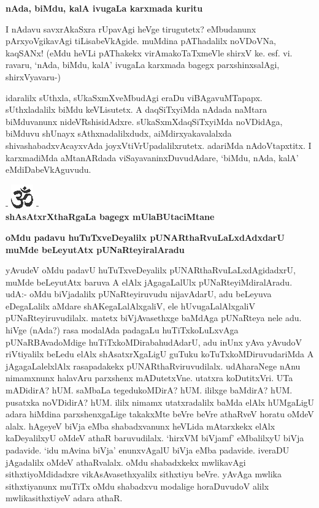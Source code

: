 {\bigskip
\noindent
{\large\bf nAda, biMdu, kalA ivugaLa karxmada kuritu}}\label{page177}
\medskip

\noindent
I nAdavu savxrAkaSxra rUpavAgi heVge tirugutetx? eMbudanunx pArxyoVgikavAgi tiLisabeVkAgide. muMdina pAThadalilx noVDoVNa, kaqSANx! (eMdu heVLi pAThakekx virAmakoTaTxmeVle shirxV ke. esf. vi. ravaru, `nAda, biMdu, kalA' ivugaLa karxmada bagegx parxshinxsalAgi, shirxVyavaru-)


idaralilx sUthxla, sUkaSxmXveMbudAgi eraDu viBAgavuMTapapx. sUthxladalilx biMdu keVLisutetx. A daqSiTxyiMda nAdada naMtara biMduvanunx nideVRshisidAdxre. sUkaSxmXdaqSiTxyiMda noVDidAga, biMduvu shUnayx sAthxnadalilxdudx, aiMdirxyakavalalxda shivashabadxvAcayxvAda joyxVtiVrUpadalilxrutetx. adariMda nAdoVtapxtitx. I karxmadiMda aMtanARdada viSayavaninxDuvudAdare, `biMdu, nAda, kalA' eMdiDabeVkAguvudu.


\bigskip

\begin{center}
- \includegraphics{om.eps} -\\[8pt]
{\bf\Large{shAsAtxrXthaRgaLa bagegx mUlaBUtaciMtane}}
\end{center}

{\medskip
\noindent
{\large\bf oMdu padavu huTuTxveDeyalilx pUNARthaRvuLaLxdAdxdarU muMde beLeyutAtx pUNaRteyiralAradu}}\label{page177a}
\medskip

\noindent
yAvudeV oMdu padavU huTuTxveDeyalilx pUNARthaRvuLaLxdAgidadxrU, muMde beLeyutAtx baruva A elAlx jAgagaLalUlx pUNaRteyiMdiralAradu. udA:- oMdu biVjadalilx pUNaRteyiruvudu nijavAdarU, adu beLeyuva eDegaLalilx aMdare shAKegaLalAlxgaliV, ele hUvugaLalAlxgaliV pUNaRteyiruvudilalx. matetx biVjAvasethxge baMdAga pUNaRteya nele adu. hiVge (nAda?) rasa modalAda padagaLu huTiTxkoLuLxvAga pUNaRBAvadoMdige huTiTxkoMDirabahudAdarU, adu inUnx yAva yAvudoV riVtiyalilx beLedu elAlx shAsatxrXgaLigU guTuku koTuTxkoMDiruvudariMda A jAgagaLalelxlAlx rasapadakekx pUNARthaRviruvudilalx. udAharaNege nAnu nimamxnunx halavAru parxshenx mADutetxVne. utatxra koDutitxVri. UTa mADidirA? hUM. saMbaLa tegedukoMDirA? hUM. ililxge baMdirA? hUM. pusatxka noVDidirA? hUM. ililx nimamx utatxradalilx baMda elAlx hUMgaLigU adara hiMdina parxshenxgaLige takakxMte beVre beVre athaRveV horatu oMdeV alalx. hAgeyeV biVja eMba shabadxvanunx heVLida mAtarxkekx elAlx kaDeyalilxyU oMdeV athaR baruvudilalx. `hirxVM biVjamf' eMbalilxyU biVja padavide. `idu mAvina biVja' enunxvAgalU biVja eMba padavide. iveraDU jAgadalilx oMdeV athaRvalalx. oMdu shabadxkekx mwlikavAgi sithxtiyoMdidadxre vikAsAvasethxyalilx sithxtiyu beVre. yAvAga mwlika sithxtiyanunx muTiTx oMdu shabadxvu modalige horaDuvudoV alilx mwlikasithxtiyeV adara athaR.

